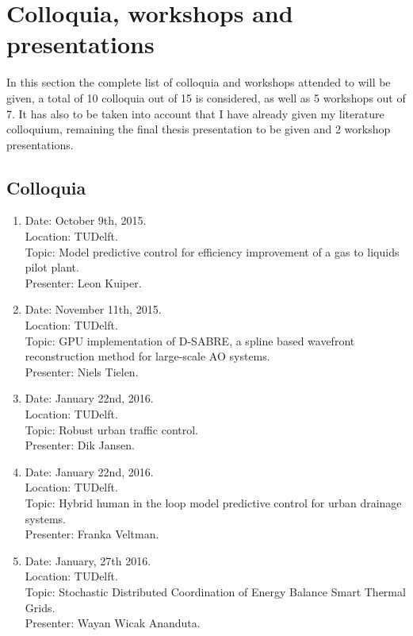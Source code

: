 \documentclass[main.tex]{subfiles}
\begin{document}
\newpage
\section{Colloquia, workshops and presentations}

In this section the complete list of colloquia and workshops attended to will be given, a total of 10 colloquia out of 15 is considered, as well as 5 workshops out of 7. It has also to be taken into account that I have already given my literature colloquium, remaining the final thesis presentation to be given and 2 workshop presentations.

\subsection{Colloquia}

\begin{enumerate}
	\item Date: October 9th, 2015. \\
		Location: TUDelft.\\
		Topic: Model predictive control for efficiency improvement of a gas to liquids pilot plant.\\
		Presenter: Leon Kuiper.
		
	\item Date: November 11th, 2015.\\
	Location: TUDelft.\\
	Topic: GPU implementation of D-SABRE, a spline based wavefront reconstruction method for large-scale AO systems.\\
	Presenter: Niels Tielen.
	
	\item Date: January 22nd, 2016.\\
	Location: TUDelft.\\
	Topic: Robust urban traffic control.\\
	Presenter: Dik Jansen.
	
	\item Date: January 22nd, 2016.\\
	Location: TUDelft.\\
	Topic: Hybrid human in the loop model predictive control for urban drainage systems.\\
	Presenter: Franka Veltman.
	
	\item Date: January, 27th 2016.\\
	Location: TUDelft.\\
	Topic: Stochastic Distributed Coordination of Energy Balance Smart Thermal Grids.\\
	Presenter: Wayan Wicak Ananduta.
	

\end{enumerate}
\end{document}
